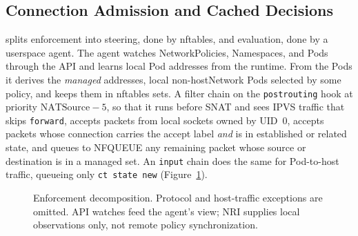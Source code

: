 \subsection{Connection Admission and Cached Decisions}
\sys{} splits enforcement into steering, done by nftables, and
evaluation, done by a userspace agent. The agent watches NetworkPolicies,
Namespaces, and Pods through the API and learns local Pod addresses from
the runtime. From the Pods it derives the \emph{managed} addresses, local
non-hostNetwork Pods selected by some policy, and keeps them in nftables
sets. A filter chain on the \texttt{postrouting} hook at priority
$\mathrm{NATSource}-5$, so that it runs before SNAT and sees IPVS traffic
that skips \texttt{forward}, accepts packets from local sockets owned by
UID~0, accepts packets whose connection carries the accept label
\emph{and} is in established or related state, and queues to NFQUEUE any
remaining packet whose source or destination is in a managed set. An
\texttt{input} chain does the same for Pod-to-host traffic, queueing only
\texttt{ct state new} (Figure~\ref{fig:architecture}).

\begin{figure}[t]
\centering
{}
\caption{Enforcement decomposition. Protocol and host-traffic exceptions
are omitted. API watches feed the agent's view; NRI supplies local
observations only, not remote policy synchronization.}
\label{fig:architecture}
\end{figure}

